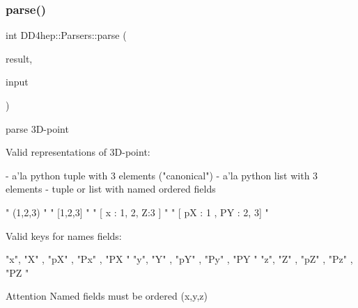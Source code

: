 \subsubsection{\texorpdfstring{parse()}{parse()}\hspace{0.1cm}{\footnotesize\ttfamily [19/21]}}
{\footnotesize\ttfamily int D\+D4hep\+::\+Parsers\+::parse (\begin{DoxyParamCaption}\item[{R\+O\+O\+T\+::\+Math\+::\+X\+Y\+Z\+Point \&}]{result,  }\item[{const std\+::string \&}]{input }\end{DoxyParamCaption})}



parse 3\+D-\/point 

Valid representations of 3\+D-\/point\+: \begin{DoxyVerb}- a'la python tuple with 3 elements ("canonical")
- a'la python list with 3 elements
- tuple or list with named ordered fields
\end{DoxyVerb}



\begin{DoxyCode}
\textcolor{stringliteral}{" (1,2,3) "}
\textcolor{stringliteral}{" [1,2,3] "}
\textcolor{stringliteral}{" [ x : 1, 2, Z:3 ] "}
\textcolor{stringliteral}{" [ pX : 1 , PY : 2, 3] "}
\end{DoxyCode}


Valid keys for names fields\+:


\begin{DoxyCode}
\textcolor{stringliteral}{"x"}, \textcolor{stringliteral}{"X"} , \textcolor{stringliteral}{"pX"} , \textcolor{stringliteral}{"Px"} , \textcolor{stringliteral}{"PX "}
\textcolor{stringliteral}{"y"}, \textcolor{stringliteral}{"Y"} , \textcolor{stringliteral}{"pY"} , \textcolor{stringliteral}{"Py"} , \textcolor{stringliteral}{"PY "}
\textcolor{stringliteral}{"z"}, \textcolor{stringliteral}{"Z"} , \textcolor{stringliteral}{"pZ"} , \textcolor{stringliteral}{"Pz"} , \textcolor{stringliteral}{"PZ "}
\end{DoxyCode}


\begin{DoxyAttention}{Attention}
Named fields must be ordered {\ttfamily (x,y,z)}
\end{DoxyAttention}

